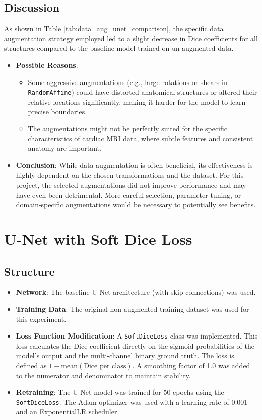 \documentclass{article}
\begin{document}
\subsection{Discussion}
As shown in Table \ref{tab:data_aug_unet_comparison}, the specific data augmentation strategy employed led to a slight decrease in Dice coefficients for all structures compared to the baseline model trained on un-augmented data.
\begin{itemize}
  \item \textbf{Possible Reasons}:
        \begin{itemize}
          \item Some aggressive augmentations (e.g., large rotations or shears in \texttt{RandomAffine}) could have distorted anatomical structures or altered their relative locations significantly, making it harder for the model to learn precise boundaries.
          \item The augmentations might not be perfectly suited for the specific characteristics of cardiac MRI data, where subtle features and consistent anatomy are important.
        \end{itemize}
  \item \textbf{Conclusion}: While data augmentation is often beneficial, its effectiveness is highly dependent on the chosen transformations and the dataset. For this project, the selected augmentations did not improve performance and may have even been detrimental. More careful selection, parameter tuning, or domain-specific augmentations would be necessary to potentially see benefits.
\end{itemize}


\section{U-Net with Soft Dice Loss}

\subsection{Structure}
\begin{itemize}
  \item \textbf{Network}: The baseline U-Net architecture (with skip connections) was used.
  \item \textbf{Training Data}: The original non-augmented training dataset was used for this experiment.
  \item \textbf{Loss Function Modification}: A \texttt{SoftDiceLoss} class was implemented. This loss calculates the Dice
        coefficient directly on the sigmoid probabilities of the model's output and the multi-channel binary ground truth. The
        loss is defined as $1 - \text{mean}(\text{Dice\_per\_class})$. A smoothing factor of 1.0 was added to the numerator and
        denominator to maintain stability.
  \item \textbf{Retraining}: The U-Net model was trained for 50 epochs using the \texttt{SoftDiceLoss}. The Adam optimizer was used with a learning rate of 0.001 and an ExponentialLR scheduler.
\end{itemize}
\end{document}
